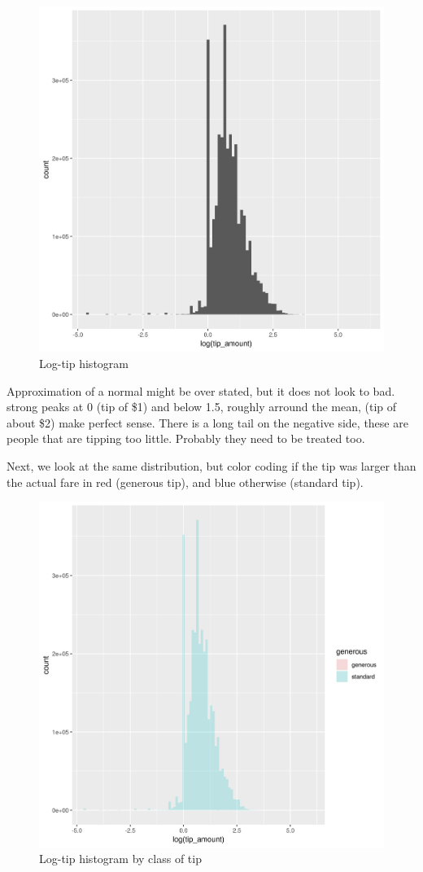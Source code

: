 \documentclass[11pt]{article}
\begin{document}
\begin{figure}[htbp]
\centering
\includegraphics[width=.9\linewidth]{./plots/logTipHist.jpg}
\caption{\label{fig:org92d467d}
Log-tip histogram}
\end{figure}

Approximation of a normal might be over stated, but it does not look to bad.
strong peaks at 0 (tip of \$1) and below 1.5, roughly arround the mean,
(tip of about \$2) make perfect sense. There is a long tail on the negative
side, these are people that are tipping too little. Probably they need to
be treated too.

Next, we look at the same distribution, but color coding if the tip was
larger than the actual fare in red (generous tip), and blue otherwise
(standard tip).

\begin{figure}[htbp]
\centering
\includegraphics[width=.9\linewidth]{./plots/logTipGenerousHist.jpg}
\caption{\label{fig:org40a24c1}
Log-tip histogram by class of tip}
\end{figure}
\end{document}
